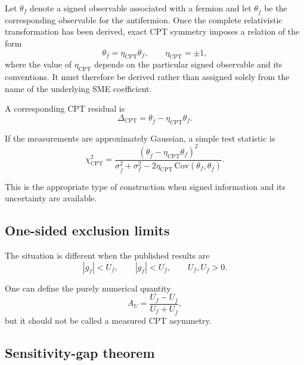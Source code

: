 \documentclass[aps,prd,reprint,superscriptaddress,nofootinbib]{revtex4-2}
\newcommand{\CPT}{\mathrm{CPT}}
\begin{document}
	Let $\theta_f$ denote a signed observable associated with a fermion and
	let $\theta_{\bar f}$ be the corresponding observable for the
	antifermion. Once the complete relativistic transformation has been
	derived, exact CPT symmetry imposes a relation of the form
	\begin{equation}
		\theta_{\bar f}
		=
		\eta_\CPT\theta_f,
		\qquad
		\eta_\CPT=\pm1,
		\label{eq:CPTsigned}
	\end{equation}
	where the value of $\eta_\CPT$ depends on the particular signed
	observable and its conventions. It must therefore be derived rather
	than assigned solely from the name of the underlying SME coefficient.
	
	A corresponding CPT residual is
	\begin{equation}
		\Delta_\CPT
		=
		\theta_{\bar f}-\eta_\CPT\theta_f .
		\label{eq:DeltaCPT}
	\end{equation}
	
	If the measurements are approximately Gaussian, a simple test statistic
	is
	\begin{equation}
		\chi^2_\CPT
		=
		\frac{
			\left(
			\theta_{\bar f}-\eta_\CPT\theta_f
			\right)^2
		}{
			\sigma_{\bar f}^2+\sigma_f^2
			-2\eta_\CPT\,\mathrm{Cov}(\theta_f,\theta_{\bar f})
		}.
		\label{eq:chiCPT}
	\end{equation}
	
	This is the appropriate type of construction when signed information
	and its uncertainty are available.
	
	\subsection{One-sided exclusion limits}
	
	The situation is different when the published results are
	\begin{equation}
		|g_f|<U_f,
		\qquad
		|g_{\bar f}|<U_{\bar f},
		\qquad
		U_f,U_{\bar f}>0 .
		\label{eq:limits}
	\end{equation}
	
	One can define the purely numerical quantity
	\begin{equation}
		A_U
		=
		\frac{U_f-U_{\bar f}}
		{U_f+U_{\bar f}},
		\label{eq:AU}
	\end{equation}
	but it should not be called a measured CPT asymmetry.
	
	\subsection{Sensitivity-gap theorem}
	
\end{document}
